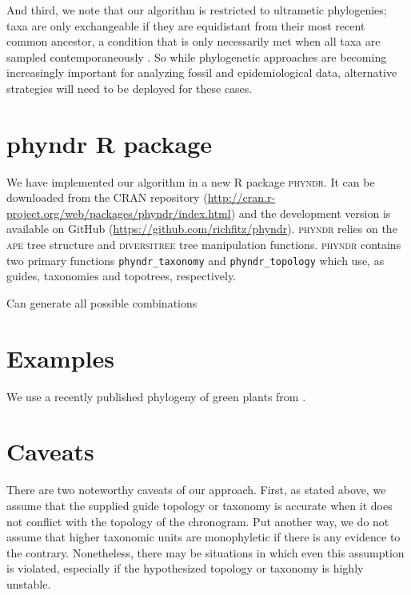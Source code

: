 \documentclass[a4paper,11pt]{article}
\begin{document}
And third, we note that our algorithm is restricted to ultrametic phylogenies; taxa are only exchangeable if they are equidistant from their most recent common ancestor, a condition that is only necessarily met when all taxa are sampled contemporaneously \citep[see][for more discussion of this point and its implications for models of trait evolution]{SlaterMEE}. So while phylogenetic approaches are becoming increasingly important for analyzing fossil and epidemiological data, alternative strategies will need to be deployed for these cases.

\section{phyndr R package}

We have implemented our algorithm in a new R package \textsc{phyndr}. It can be downloaded from the CRAN repository (\url{http://cran.r-project.org/web/packages/phyndr/index.html}) and the development version is available on GitHub (\url{https://github.com/richfitz/phyndr}). \textsc{phyndr} relies on the \textsc{ape} \citep{ape} tree structure and \textsc{diversitree} \citep{FitzJohn2012} tree manipulation functions. \textsc{phyndr} contains two primary functions \texttt{phyndr\_taxonomy} and \texttt{phyndr\_topology} which use, as guides, taxonomies and topotrees, respectively. 

Can generate all possible combinations


\section{Examples}

We use a recently published phylogeny of green plants from \citet{Ruhfel2014}.

\section{Caveats}

There are two noteworthy caveats of our approach. First, as stated above, we assume that the supplied guide topology or taxonomy is accurate when it does not conflict with the topology of the chronogram. Put another way, we do not assume that higher taxonomic units are monophyletic if there is any evidence to the contrary. Nonetheless, there may be situations in which even this assumption is violated, especially if the hypothesized topology or taxonomy is highly unstable. 
\end{document}
